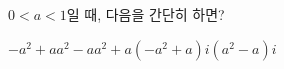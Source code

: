 $0<a<1$일 때, 다음을 간단히 하면? 
\begin{choices32}{$-a^2+a$}{$a^2-a$}{$a^2+a$}{$(-a^2+a)i$}{$(a^2-a)i$}\end{choices32}
